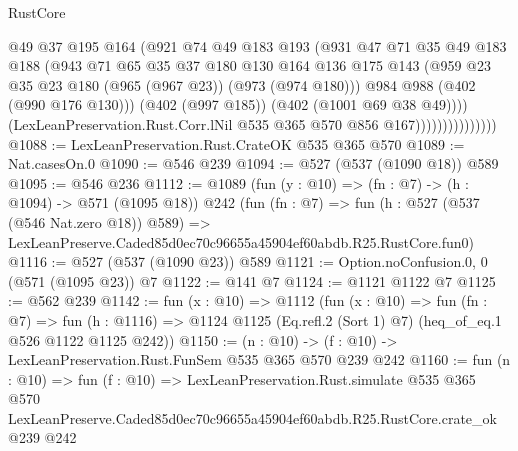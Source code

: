 \begin{lexlean}{RustCore}
\begin{coremodule}
                                @49
                                @37
                                @195
                                @164
                                (@921
                                  @74
                                  @49
                                  @183
                                  @193
                                  (@931
                                    @47
                                    @71
                                    @35
                                    @49
                                    @183
                                    @188
                                    (@943
                                      @71
                                      @65
                                      @35
                                      @37
                                      @180
                                      @130
                                      @164
                                      @136
                                      @175
                                      @143
                                      (@959 @23 @35 @23 @180 (@965 (@967 @23)) (@973 (@974 @180)))
                                      @984
                                      @988
                                      (@402 (@990 @176 @130)))
                                    (@402 (@997 @185))
                                    (@402 (@1001 @69 @38 @49))))
                                (LexLeanPreservation.Rust.Corr.lNil
                                  @535
                                  @365
                                  @570
                                  @856
                                  @167)))))))))))))))
@1088 := LexLeanPreservation.Rust.CrateOK @535 @365 @570
@1089 := Nat.casesOn.{0}
@1090 := @546 @239
@1094 := @527 (@537 (@1090 @18)) @589
@1095 := @546 @236
@1112 := @1089
    (fun (y : @10) => (fn : @7) -> (h : @1094) -> @571 (@1095 @18))
    @242
    (fun (fn : @7) =>
    fun (h : @527 (@537 (@546 Nat.zero @18)) @589) =>
    LexLeanPreserve.Caded85d0ec70c96655a45904ef60abdb.R25.RustCore.fun0)
@1116 := @527 (@537 (@1090 @23)) @589
@1121 := Option.noConfusion.{0, 0} (@571 (@1095 @23)) @7
@1122 := @141 @7
@1124 := @1121 @1122 @7
@1125 := @562 @239
@1142 := fun (x : @10) =>
  @1112
    (fun (x : @10) =>
    fun (fn : @7) =>
    fun (h : @1116) => @1124 @1125 (Eq.refl.{2} (Sort 1) @7) (heq_of_eq.{1} @526 @1122 @1125 @242))
@1150 := (n : @10) -> (f : @10) -> LexLeanPreservation.Rust.FunSem @535 @365 @570 @239 @242
@1160 := fun (n : @10) =>
  fun (f : @10) =>
  LexLeanPreservation.Rust.simulate
    @535
    @365
    @570
    LexLeanPreserve.Caded85d0ec70c96655a45904ef60abdb.R25.RustCore.crate_ok
    @239
    @242
\end{coremodule}
\end{lexlean}
